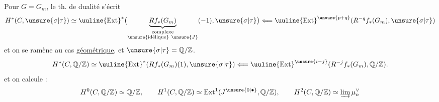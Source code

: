 Pour $G=G_m$, le th. de dualité s'écrit 
\[
H^*(C,\unsure{\sigma|\tau})\simeq
\uuline{\operatorname{Ext}}^*\bigl(\underbrace{Rf_*(G_m)}_{\substack{\text{complexe}\\\text{\unsure{idélique}}\ \unsure{J}}}(-1),\unsure{\sigma|\tau}\bigr)
\Longleftarrow\uuline{\operatorname{Ext}}^{\unsure{p+q}}(R^{-q}f_*(G_m),\unsure{\sigma|\tau})
\]
et on se ramène au cas \uline{géométrique}, et $\unsure{\sigma|\tau}=\mathbb Q/\mathbb Z$.
\[
H^*(C,\mathbb Q/\mathbb Z)\simeq\uuline{\operatorname{Ext}}^*(Rf_*(G_m)(1),\unsure{\sigma|\tau})
\Longleftarrow\uuline{\operatorname{Ext}}^{\unsure{i-j}}(R^{-j}f_*(G_m),\mathbb Q/\mathbb Z).
\]
et on calcule :
\[
H^0(C,\mathbb Q/\mathbb Z)\simeq\mathbb Q/\mathbb Z,\qquad
H^1(C,\mathbb Q/\mathbb Z)\simeq\operatorname{Ext}^1(J^{\unsure{0|\bullet}},\mathbb Q/\mathbb Z),\qquad
H^2(C,\mathbb Q/\mathbb Z)\simeq\varinjlim\mu_n^\vee
\]

